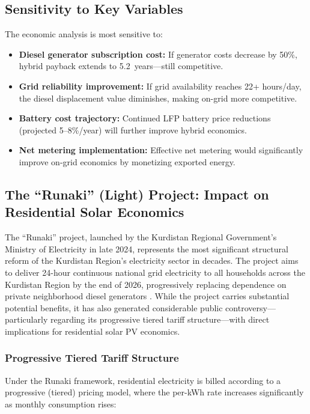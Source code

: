 \subsection{Sensitivity to Key Variables}

The economic analysis is most sensitive to:
\begin{itemize}
    \item \textbf{Diesel generator subscription cost:} If generator costs decrease by 50\%, hybrid payback extends to 5.2~years---still competitive.
    \item \textbf{Grid reliability improvement:} If grid availability reaches 22+ hours/day, the diesel displacement value diminishes, making on-grid more competitive.
    \item \textbf{Battery cost trajectory:} Continued LFP battery price reductions (projected 5--8\%/year) will further improve hybrid economics.
    \item \textbf{Net metering implementation:} Effective net metering would significantly improve on-grid economics by monetizing exported energy.
\end{itemize}


\subsection{The ``Runaki'' (Light) Project: Impact on Residential Solar Economics}

The ``Runaki'' project, launched by the Kurdistan Regional Government's Ministry of Electricity in late 2024, represents the most significant structural reform of the Kurdistan Region's electricity sector in decades. The project aims to deliver 24-hour continuous national grid electricity to all households across the Kurdistan Region by the end of 2026, progressively replacing dependence on private neighborhood diesel generators \cite{krgmoe2024}. While the project carries substantial potential benefits, it has also generated considerable public controversy---particularly regarding its progressive tiered tariff structure---with direct implications for residential solar PV economics.

\subsubsection{Progressive Tiered Tariff Structure}

Under the Runaki framework, residential electricity is billed according to a progressive (tiered) pricing model, where the per-kWh rate increases significantly as monthly consumption rises:

